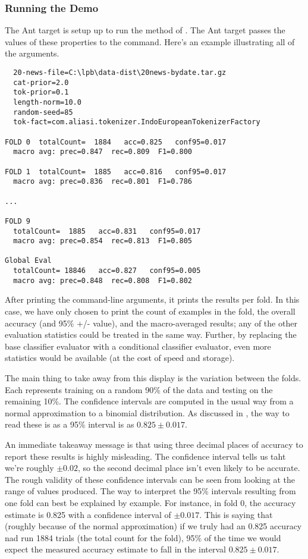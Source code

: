 \subsubsection{Running the Demo}

The Ant target  is setup up to run the
 method of .  The Ant target
passes the values of these properties to the command.  Here's
an example illustrating all of the arguments.
%
\begin{verbatim}
  20-news-file=C:\lpb\data-dist\20news-bydate.tar.gz
  cat-prior=2.0
  tok-prior=0.1
  length-norm=10.0
  random-seed=85
  tok-fact=com.aliasi.tokenizer.IndoEuropeanTokenizerFactory

FOLD 0  totalCount=  1884   acc=0.825   conf95=0.017
  macro avg: prec=0.847  rec=0.809  F1=0.800

FOLD 1  totalCount=  1885   acc=0.816   conf95=0.017
  macro avg: prec=0.836  rec=0.801  F1=0.786

...

FOLD 9
  totalCount=  1885   acc=0.831   conf95=0.017
  macro avg: prec=0.854  rec=0.813  F1=0.805

Global Eval
  totalCount= 18846   acc=0.827   conf95=0.005
  macro avg: prec=0.848  rec=0.808  F1=0.802
\end{verbatim}
%
After printing the command-line arguments, it prints the results per
fold.  In this case, we have only chosen to print the count of
examples in the fold, the overall accuracy (and 95\% +/- value), and
the macro-averaged results; any of the other evaluation statistics
could be treated in the same way.  Further, by replacing the base
classifier evaluator with a conditional classifier evaluator, even
more statistics would be available (at the cost of speed and storage).

The main thing to take away from this display is the variation between
the folds.  Each represents training on a random 90\% of the data and
testing on the remaining 10\%.  The confidence intervals are computed
in the usual way from a normal approximation to a binomial
distribution.  As discussed in , the
way to read these is as a 95\% interval is as $0.825 \pm 0.017$.

An immediate takeaway message is that using three decimal places of
accuracy to report these results is highly misleading.  The confidence
interval tells us taht we're roughly $\pm 0.02$, so the second decimal
place isn't even likely to be accurate.  The rough validity of these
confidence intervals can be seen from looking at the range of values
produced.  The way to interpret the 95\% intervals resulting from one
fold can best be explained by example.  For instance, in fold 0, the
accuracy estimate is 0.825 with a confidence interval of $\pm 0.017$.
This is saying that (roughly because of the normal approximation)
if we truly had an 0.825 accuracy nad run 1884 trials (the total count
for the fold), 95\% of the time we would expect the measured
accuracy estimate to fall in the interval $0.825 \pm 0.017$.

